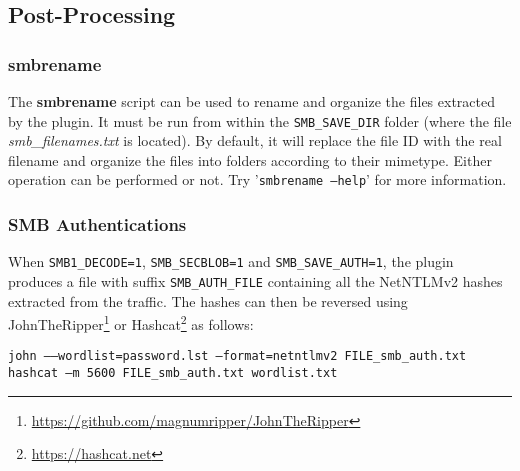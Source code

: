 \documentclass[documentation]{subfiles}
\begin{document}
\subsection{Post-Processing}\label{smb:postproc}

\subsubsection{smbrename}
The {\bf smbrename} script can be used to rename and organize the files extracted by the plugin.
It must be run from within the {\tt SMB\_SAVE\_DIR} folder (where the file {\em smb\_filenames.txt} is located). By default, it will replace the file ID with the real filename and organize the files into folders according to their mimetype. Either operation can be performed or not. Try '{\tt smbrename --help}' for more information.

\subsubsection{SMB Authentications}
When {\tt SMB1\_DECODE=1}, {\tt SMB\_SECBLOB=1} and {\tt SMB\_SAVE\_AUTH=1}, the plugin produces a file with suffix {\tt SMB\_AUTH\_FILE} containing all the NetNTLMv2 hashes extracted from the traffic.
The hashes can then be reversed using JohnTheRipper\footnote{\url{https://github.com/magnumripper/JohnTheRipper}} or Hashcat\footnote{\url{https://hashcat.net}} as follows:

\begin{center}
    {\tt john --{}--wordlist=password.lst --format=netntlmv2 FILE\_smb\_auth.txt}\\
    {\tt hashcat --m 5600 FILE\_smb\_auth.txt wordlist.txt}
\end{center}
\end{document}
